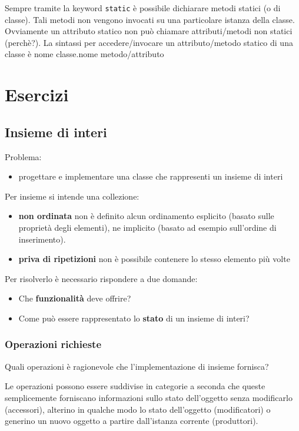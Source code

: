 \documentclass{article}
\begin{document}
Sempre tramite la keyword \texttt{static}
è possibile dichiarare metodi statici (o di classe).
Tali metodi non vengono invocati su una particolare
istanza della classe.
Ovviamente un attributo statico non può chiamare
attributi/metodi non statici (perchè?).
La sintassi per accedere/invocare un attributo/metodo statico
di una classe è
nome classe.nome metodo/attributo

\section{Esercizi}

\subsection{Insieme di interi}
Problema:
\begin{itemize}
	\item  progettare e implementare una classe che rappresenti un insieme di interi
\end{itemize}
Per insieme si intende una collezione:
\begin{itemize}
	\item \textbf{non ordinata} non è definito alcun ordinamento esplicito (basato sulle proprietà degli elementi),
	ne implicito (basato ad esempio sull'ordine di inserimento).
	\item \textbf{priva di ripetizioni} non è possibile contenere lo stesso elemento più volte
\end{itemize}

Per risolverlo è necessario rispondere a due domande:
\begin{itemize}
		\item Che \textbf{funzionalità} deve offrire?
	\item Come può essere rappresentato lo \textbf{stato} di un insieme di interi?

\end{itemize}

\subsubsection{Operazioni richieste}

Quali operazioni è ragionevole che l'implementazione di insieme fornisca?

Le operazioni possono essere suddivise in categorie a seconda che
queste semplicemente forniscano informazioni sullo stato dell'oggetto senza modificarlo (accessori),
alterino in qualche modo lo stato dell'oggetto (modificatori) o
generino un nuovo oggetto a partire dall'istanza  corrente (produttori).
\end{document}
